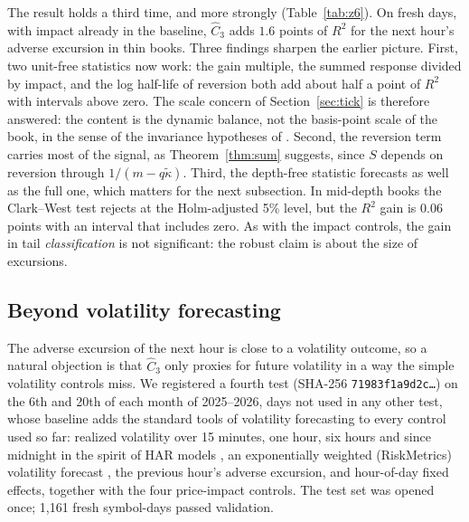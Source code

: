 The result holds a third time, and more strongly (Table~\ref{tab:z6}). On fresh days, with impact already in the baseline, $\hat C_3$ adds $1.6$ points of $R^2$ for the next hour's adverse excursion in thin books. Three findings sharpen the earlier picture. First, two unit-free statistics now work: the gain multiple, the summed response divided by impact, and the log half-life of reversion both add about half a point of $R^2$ with intervals above zero. The scale concern of Section~\ref{sec:tick} is therefore answered: the content is the dynamic balance, not the basis-point scale of the book, in the sense of the invariance hypotheses of \citet{kyle2016}. Second, the reversion term carries most of the signal, as Theorem~\ref{thm:sum} suggests, since $S$ depends on reversion through $1/(m-q\tilde\kappa)$. Third, the depth-free statistic forecasts as well as the full one, which matters for the next subsection. In mid-depth books the Clark--West test rejects at the Holm-adjusted 5\% level, but the $R^2$ gain is $0.06$ points with an interval that includes zero. As with the impact controls, the gain in tail \emph{classification} is not significant: the robust claim is about the size of excursions.

\subsection{Beyond volatility forecasting}\label{sec:z9}
The adverse excursion of the next hour is close to a volatility outcome, so a natural objection is that $\hat C_3$ only proxies for future volatility in a way the simple volatility controls miss. We registered a fourth test (SHA-256 \texttt{71983f1a9d2c\ldots}) on the 6th and 20th of each month of 2025--2026, days not used in any other test, whose baseline adds the standard tools of volatility forecasting to every control used so far: realized volatility over 15 minutes, one hour, six hours and since midnight in the spirit of HAR models \citep{corsi2009}, an exponentially weighted (RiskMetrics) volatility forecast \citep{riskmetrics1996}, the previous hour's adverse excursion, and hour-of-day fixed effects, together with the four price-impact controls. The test set was opened once; 1{,}161 fresh symbol-days passed validation.

